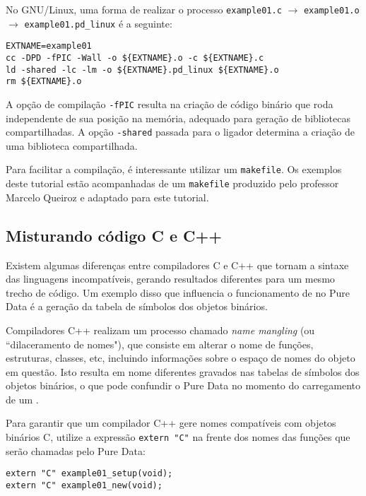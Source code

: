No GNU/Linux, uma forma de realizar o processo
\texttt{example01.c} $\rightarrow$ \texttt{example01.o} $\rightarrow$
\texttt{example01.pd\_linux} é a seguinte:

\vspace{1em}
\begin{lstlisting}
EXTNAME=example01
cc -DPD -fPIC -Wall -o ${EXTNAME}.o -c ${EXTNAME}.c
ld -shared -lc -lm -o ${EXTNAME}.pd_linux ${EXTNAME}.o
rm ${EXTNAME}.o
\end{lstlisting}

A opção de compilação \texttt{-fPIC} resulta na criação de código binário que
roda independente de sua posição na memória, adequado para geração de
bibliotecas compartilhadas. A opção \texttt{-shared} passada para o ligador
determina a criação de uma biblioteca compartilhada.

Para facilitar a compilação, é interessante utilizar um \texttt{makefile}. Os
exemplos deste tutorial estão acompanhadas de um \texttt{makefile} produzido
pelo professor Marcelo Queiroz e adaptado para este tutorial.

\subsection{Misturando código C e C++}

Existem algumas diferenças entre compiladores C e C++ que tornam a sintaxe das
linguagens incompatíveis, gerando resultados diferentes para um mesmo trecho
de código. Um exemplo disso que influencia o funcionamento de \externals no
Pure Data é a geração da tabela de símbolos dos objetos binários.

Compiladores C++ realizam um processo chamado \emph{name mangling} (ou
``dilaceramento de nomes"), que consiste em alterar o nome de funções,
estruturas, classes, etc, incluindo informações sobre o espaço de nomes do
objeto em questão. Isto resulta em nome diferentes gravados nas tabelas de
símbolos dos objetos binários, o que pode confundir o Pure Data no momento do
carregamento de um \external.

Para garantir que um compilador C++ gere nomes compatíveis com objetos
binários C, utilize a expressão \texttt{extern "C"} na frente dos nomes das
funções que serão chamadas pelo Pure Data:

\begin{lstlisting}
extern "C" example01_setup(void);
extern "C" example01_new(void);
\end{lstlisting}

